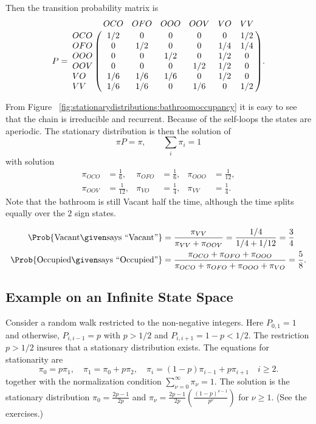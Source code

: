 \documentclass[12pt]{article}
\begin{document}
\begin{enumerate}
Then the transition probability matrix is
\[
    P= \bordermatrix{ & OCO & OFO & OOO & OOV & VO & VV \cr
    OCO & 1/2 & 0 & 0 & 0 & 0 & 1/2 \cr
    OFO & 0 & 1/2 & 0 & 0 & 1/4 & 1/4 \cr
    OOO & 0 & 0 & 1/2 & 0 & 1/2 & 0 \cr
    OOV & 0 & 0 & 0 & 1/2 & 1/2 & 0 \cr
    VO & 1/6 & 1/6 & 1/6 & 0 & 1/2 & 0 \cr
    VV & 1/6 & 1/6 & 0 & 1/6 & 0 & 1/2 \cr
    }.
\]

From Figure~%
\ref{fig:stationarydistributions:bathroomoccupancy} it is easy to see
that the chain is irreducible and recurrent.  Because of the self-loops
the states are aperiodic.  The stationary distribution is then the
solution of
\[
    \pi P = \pi, \qquad \sum\limits_{i} \pi_i = 1
\] with solution
\begin{align*}
    \pi_{OCO} &= \frac{1}{6}, & \pi_{OFO} &= \frac{1}{6}, & \pi_{OOO} &=
    \frac {1}{12}, \\
    \pi_{OOV} &= \frac{1}{12}, & \pi_{VO} &= \frac{1}{4}, & \pi_{VV} &=
    \frac{1}{4}.
\end{align*}
Note that the bathroom is still Vacant half the time, although the time
splits equally over the \( 2 \) sign states.

\begin{align*}
    \Prob{ \text{Vacant}\given \text{says ``Vacant''}} &= \frac{\pi_{VV}}
    {\pi_{VV}+\pi_{OOV}} = \frac{1/4}{1/4+1/12} = \frac{3}{4}\\
    \Prob{ \text{Occupied}\given \text{says ``Occupied''} } &= \frac{\pi_
    {OCO}+\pi_{OFO}+\pi_{OOO}} {\pi_{OCO}+\pi_{OFO}+\pi_{OOO}+\pi_{VO}}
    =\frac{5}{8}.
\end{align*}

\subsection*{Example on an Infinite State Space}

Consider a random walk restricted to the non-negative integers.  Here
\( P_{0,1} = 1 \) and otherwise, \( P_{i,i-1} = p \) with \( p > 1/2 \)
and \( P_{i,i+1} = 1- p < 1/2 \).  The restriction \( p > 1/2 \) 
insures that a stationary distribution exists.   The equations for
stationarity are
\[
  \pi_0 = p \pi_1, \quad \pi_1 = \pi_0 + p \pi_2, \quad \pi_i = (1-p)
  \pi_{i-1} + p \pi_{i+1} \quad i \ge 2.
\]
together with the normalization condition \( \sum_{\nu=0}^{\infty}
\pi_{\nu} = 1 \).
The solution is the stationary distribution \( \pi_0 = \frac{2p-1}{2p}
\) and \( \pi_{\nu} = \frac{2p-1}{2p} \left( \frac{(1-p)^{\nu -
      1}}{p^{\nu}} \right) \) for \( \nu \ge 1 \).  (See the exercises.)


\end{enumerate}
\end{document}
